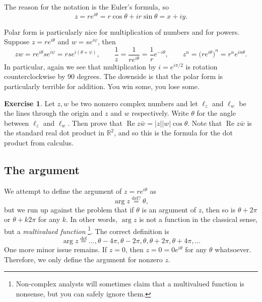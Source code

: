 \documentclass[12pt,openany]{book}
\renewcommand{\Re}{\operatorname{Re}}
\newcommand{\sabs}[1]{\lvert {#1} \rvert}
\newcommand{\R}{{\mathbb{R}}}
\newcommand{\myindex}[1]{#1\index{#1}}
\theoremstyle{plain}
\theoremstyle{remark}
\theoremstyle{definition}
\newenvironment{exbox}{%
    \def\FrameCommand{\vrule width 1pt \relax\hspace {10pt}}%
    \MakeFramed {\advance \hsize -\width \FrameRestore }%
}{%
    \endMakeFramed
}
\theoremstyle{exercise}
\newtheorem{exercise}{Exercise}[section]
\theoremstyle{example}
\begin{document}
The reason for the notation is the
Euler's formula, so
\begin{equation*}
z = r e^{i\theta} = r\cos \theta + i r\sin \theta  = x+iy .
\end{equation*}

Polar form is particularly nice for multiplication of numbers and for powers.
Suppose $z = r e^{i\theta}$ and $w = s e^{i \psi}$, then
\begin{equation*}
zw =
r e^{i \theta} s e^{i \psi} = 
rs e^{i (\theta+ \psi)},
\qquad
\frac{1}{z} =
\frac{1}{r e^{i \theta}} =
\frac{1}{r} e^{-i \theta} ,
\qquad
z^n =
{\bigl(r e^{i \theta}\bigr)}^n =
r^n e^{i n\theta} .
\end{equation*}
In particular, again we see that multiplication by $i = e^{i \pi / 2}$ is
rotation counterclockwise by $90$ degrees.
The downside is that the polar form is particularly terrible for addition.
You win some, you lose some.

\begin{exbox}
\begin{exercise}
Let $z,w$ be two nonzero complex numbers and let
$\ell_z$ and $\ell_w$ be the lines through the origin and
$z$ and $w$ respectively.  Write $\theta$ for the angle between $\ell_z$ and
$\ell_w$.  Then prove that
$\Re z\bar{w} = \sabs{z} \sabs{w} \cos \theta$.
Note that $\Re z\bar{w}$ is the standard real dot product in $\R^2$, and so
this is the formula for the dot product from calculus.
\end{exercise}
\end{exbox}

\subsection{The argument}

We attempt to define the argument of $z = re^{i\theta}$ as
%
\begin{equation*}
\arg z
\overset{\text{def?}}{=}
\theta ,
\end{equation*}
but we run up against the problem that if $\theta$ is an argument of $z$,
then so is $\theta+2\pi$ or $\theta + k 2\pi$ for any $k$.  In other words,
$\arg z$ is not a function in the classical sense, but a
\emph{\myindex{multivalued function}}%
\footnote{Non-complex analysts will sometimes claim that a multivalued
function is nonsense, but you can safely ignore them.}.  The correct
definition is
\begin{equation*}
\arg z
\overset{\text{def}}{=}
\ldots,\theta - 4\pi,
\theta - 2\pi,
\theta ,
\theta + 2\pi,
\theta + 4\pi, \ldots
\end{equation*}
One more minor issue remains.  If $z=0$, then $z=0=0 e^{i\theta}$ for any
$\theta$ whatsoever.  Therefore, we only define the argument for nonzero
$z$.
\end{document}
